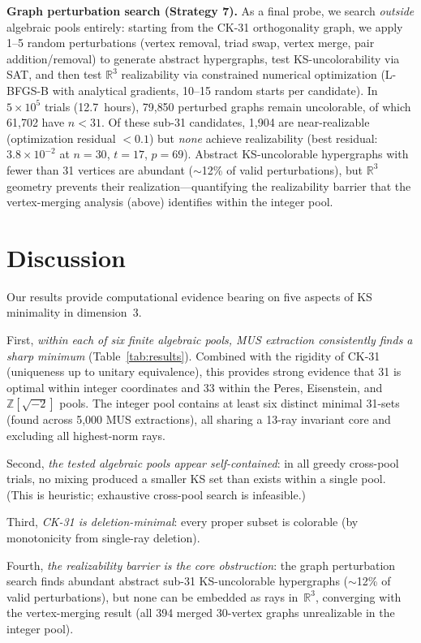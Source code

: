 \documentclass[twocolumn,prl,superscriptaddress,nofootinbib]{revtex4-2}
\newcommand{\R}{\mathbb{R}}
\newcommand{\Z}{\mathbb{Z}}
\begin{document}
\textbf{Graph perturbation search (Strategy 7).} As a final probe, we search \emph{outside} algebraic pools entirely: starting from the CK-31 orthogonality graph, we apply 1--5 random perturbations (vertex removal, triad swap, vertex merge, pair addition/removal) to generate abstract hypergraphs, test KS-uncolorability via SAT, and then test $\R^3$ realizability via constrained numerical optimization (L-BFGS-B with analytical gradients, 10--15 random starts per candidate). In $5 \times 10^5$ trials (12.7~hours), 79{,}850 perturbed graphs remain uncolorable, of which 61{,}702 have $n < 31$. Of these sub-31 candidates, 1{,}904 are near-realizable (optimization residual $< 0.1$) but \emph{none} achieve realizability (best residual: $3.8 \times 10^{-2}$ at $n = 30$, $t = 17$, $p = 69$). Abstract KS-uncolorable hypergraphs with fewer than 31 vertices are abundant ($\sim$12\% of valid perturbations), but $\R^3$ geometry prevents their realization---quantifying the realizability barrier that the vertex-merging analysis (above) identifies within the integer pool.

\section{Discussion}

Our results provide computational evidence bearing on five aspects of KS minimality in dimension~3.

First, \emph{within each of six finite algebraic pools, MUS extraction consistently finds a sharp minimum} (Table~\ref{tab:results}).  Combined with the rigidity of CK-31~\cite{TrandafirCabello2025} (uniqueness up to unitary equivalence), this provides strong evidence that 31 is optimal within integer coordinates and 33 within the Peres, Eisenstein, and $\Z[\sqrt{-2}]$ pools.  The integer pool contains at least six distinct minimal 31-sets (found across 5{,}000 MUS extractions), all sharing a 13-ray invariant core and excluding all highest-norm rays.

Second, \emph{the tested algebraic pools appear self-contained}: in all greedy cross-pool trials, no mixing produced a smaller KS set than exists within a single pool.  (This is heuristic; exhaustive cross-pool search is infeasible.)

Third, \emph{CK-31 is deletion-minimal}: every proper subset is colorable (by monotonicity from single-ray deletion).

Fourth, \emph{the realizability barrier is the core obstruction}: the graph perturbation search finds abundant abstract sub-31 KS-uncolorable hypergraphs ($\sim$12\% of valid perturbations), but none can be embedded as rays in~$\R^3$, converging with the vertex-merging result (all 394 merged 30-vertex graphs unrealizable in the integer pool).
\end{document}
